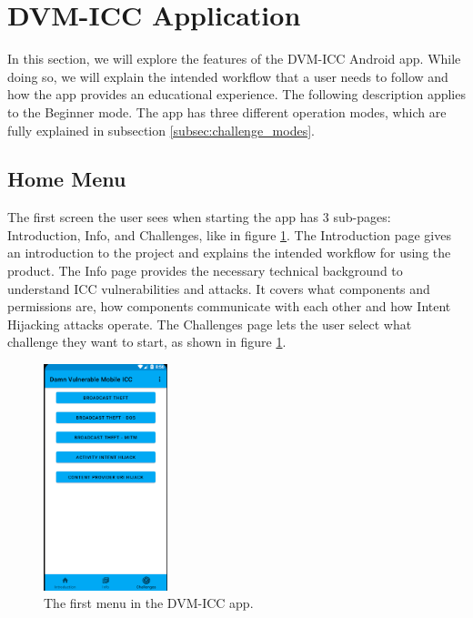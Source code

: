     \section{DVM-ICC Application}
        \label{sec:home_app}
        
    In this section, we will explore the features of the DVM-ICC Android app. While doing so, we will explain the intended workflow that a user needs to follow and how the app provides an educational experience. The following description applies to the Beginner mode. The app has three different operation modes, which are fully explained in subsection \ref{subsec:challenge_modes}.
    
    \subsection{Home Menu}
        \label{subsec:home_menu}
        
    The first screen the user sees when starting the app has 3 sub-pages: Introduction, Info, and Challenges, like in figure \ref{fig:home_menu}. The Introduction page gives an introduction to the project and explains the intended workflow for using the product. The Info page provides the necessary technical background to understand ICC vulnerabilities and attacks. It covers what components and permissions are, how components communicate with each other and how Intent Hijacking attacks operate. The Challenges page lets the user select what challenge they want to start, as shown in figure \ref{fig:home_menu}.
    
    \begin{figure}
        \centering
        \includegraphics[width=0.32\textwidth]{graphics/home_activity.PNG}
        \caption{The first menu in the DVM-ICC app.}
        \label{fig:home_menu}
    \end{figure}
    
